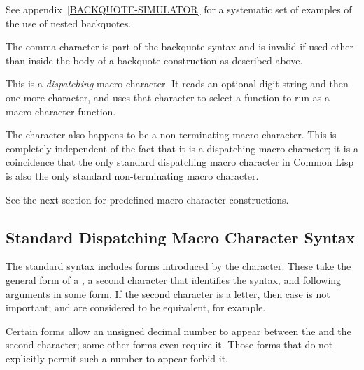 \begin{flushdesc}
\begin{new}
See appendix~\ref{BACKQUOTE-SIMULATOR} for a systematic set of examples
of the use of nested backquotes.
\end{new}

\item[\cd{,}]
The comma character is part of the backquote syntax
and is invalid if used other than inside the body of a backquote
construction as described above.

\item[\cd{\#}]
This is a \emph{dispatching} macro character.
It reads an optional digit string and then one more character,
and uses that character to select a function to run as a macro-character
function.

The \cd{\#} character also happens to be a non-terminating
macro character.  This is completely independent of the fact that
it is a dispatching macro character; it is a coincidence that
the only standard dispatching macro character in Common Lisp is
also the only standard non-terminating macro character.

See the next section for predefined \cd{\#} macro-character constructions.
\end{flushdesc}

\subsection{Standard Dispatching Macro Character Syntax}
\label{SHARP-SIGN-MACRO-CHARACTER-SECTION}

The standard syntax includes forms introduced by the \cd{\#} character.
These take the general form of a \cd{\#},
a second character that identifies the syntax,
and following arguments in some form.
If the second character is a letter, then case is not important;
 and  are considered to be equivalent, for example.

Certain \cd{\#} forms allow an unsigned decimal number to appear
between the \cd{\#} and the second character; some other
forms even require it.  Those forms that do not explicitly permit
such a number to appear forbid it.

